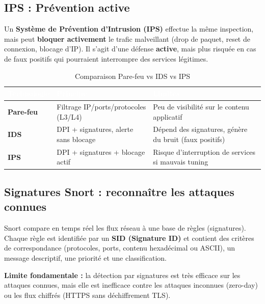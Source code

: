 \documentclass[12pt,a4paper,openany]{report}
\begin{document}
\subsection{IPS : Prévention active}

Un \textbf{Système de Prévention d'Intrusion (IPS)} effectue la même inspection, mais peut
\textbf{bloquer activement} le trafic malveillant (drop de paquet, reset de connexion, blocage d'IP).
Il s'agit d'une défense \textbf{active}, mais plus risquée en cas de faux positifs qui pourraient
interrompre des services légitimes.

\begin{table}[H]
    \centering
    \renewcommand{\arraystretch}{1.8}
    \setlength{\tabcolsep}{10pt}
    \setlength{\arrayrulewidth}{0.8pt}
    \begin{tabularx}{\textwidth}{|>{\bfseries}p{2.5cm}|X|X|}
        \arrayrulecolor{tableborder}
        \hline
        \rowcolor{tableheadbg}
        \textcolor{white}{\textbf{Technologie}} &
        \textcolor{white}{\textbf{Principe}} &
        \textcolor{white}{\textbf{Limites}} \\
        \hline
        \rowcolor{tablerowalt}
        Pare-feu & Filtrage IP/ports/protocoles (L3/L4) & Peu de visibilité sur le contenu applicatif \\
        \hline
        IDS & DPI + signatures, alerte sans blocage & Dépend des signatures, génère du bruit (faux positifs) \\
        \hline
        \rowcolor{tablerowalt}
        IPS & DPI + signatures + blocage actif & Risque d'interruption de services si mauvais tuning \\
        \hline
    \end{tabularx}
    \caption{Comparaison Pare-feu vs IDS vs IPS}
    \label{tab:fw-ids-ips-ch5}
\end{table}

\subsection{Signatures Snort : reconnaître les attaques connues}

Snort compare en temps réel les flux réseau à une base de règles (signatures). Chaque règle est
identifiée par un \textbf{SID (Signature ID)} et contient des critères de correspondance (protocoles,
ports, contenu hexadécimal ou ASCII), un message descriptif, une priorité et une classification.

\textbf{Limite fondamentale :} la détection par signatures est très efficace sur les attaques connues,
mais elle est inefficace contre les attaques inconnues (zero-day) ou les flux chiffrés (HTTPS sans
déchiffrement TLS).
\end{document}
